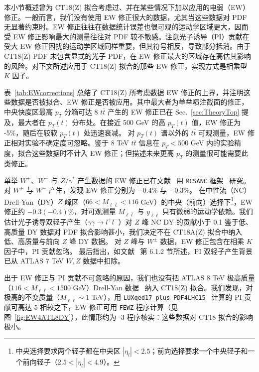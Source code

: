 本小节概述曾为 CT18(Z) 拟合考虑过、并在某些情况下加以应用的电弱（EW）修正。一般而言，我们没有使用 EW 修正很大的数据，尤其当这些数据对 PDF 无显著约束时。EW 修正往往在数据统计误差也很可观的运动学区域更大，因而受 EW 修正影响最大的测量往往对 PDF 较不敏感。注意光子诱导（PI）贡献在受大 EW 修正困扰的运动学区域同样重要，但其符号相反，导致部分抵消。由于 CT18(Z) PDF 未包含显式的光子 PDF，在 EW 修正最大的区域存在高估其影响的风险。对下文所述应用于 CT18(Z) 拟合的那些 EW 修正，实现方式是相乘型 $K$ 因子。

表~\ref{tab:EWcorrections} 总结了 CT18(Z) 所考虑数据 EW 修正的上界，并注明这些数据是否被拟合、EW 修正是否被应用。其中最大者为单举喷注截面的修正，中央快度区最高 $p_{T}$ 分箱可达 8%
$t\bar{t}$ 产生的 EW 修正已在 Sec.~\ref{sec:TheoryTop} 提及，最大者在 $p_{T}(t)$
分布处。在接近 500 GeV 的高 $p_{T}(t)$ 值，EW 修正为
-5\%，随后在较软 $p_{T}(t)$ 处迅速衰减。
对 $p_{T}(t)$ 谱以外的 $t\bar{t}$ 可观测量，EW 修正相对实验不确定度可忽略。鉴于 8 TeV $t\bar{t}$ 信息在 $p_T\! <\! 500$ GeV 内的实验精度，拟合这些数据时不计入 EW 修正；但描述未来更高 $p_T$ 的测量很可能需要此类修正。

单举 $W^+$、$W^-$ 与 $Z/\gamma^*$
产生数据的 EW 修正已在文献~\cite{Aaboud:2016btc} 用 \texttt{MCSANC} 框架~\cite{Arbuzov:2015yja} 研究。
对 $W^{+}$ 与 $W^{-}$ 产生，发现 EW 修正分别为 $-0.4$\% 与 $-0.3$\%。
在中性流（NC）Drell-Yan（DY）$Z$ 峰区（$66\!<\!M_{\ell \bar \ell}\!<\!116$ GeV）的中央（前向）选择下\footnote{中央选择要求两个轻子都在中央区 $|\eta_l|<2.5$；前向选择要求一个中央轻子和一个前向轻子（$2.5<|\eta_l|<4.9$）。}，EW
修正约 $-0.3(-0.4)\%$，对可观测量 $M_{\ell \bar \ell}$ 与 $y_{\ell \bar \ell}$ 只有微弱的运动学依赖。我们估计光子诱导双轻子产生（$\gamma\gamma\to l^{+}l^{-}$）对 $Z$ 峰 NC DY 的贡献小于 0.1%
鉴于低、高质量 DY 数据对 PDF 拟合影响甚小，我们决定不在 CT18A(Z) 拟合中纳入低、高质量与前向 $Z$ 峰 DY 数据。
对 $Z$ 峰与 $W^\pm$ 数据，EW 修正包含在相乘 $K$ 因子中，PI 贡献忽略。
最后指出，如文献~\cite{Aaboud:2016btc} 第 6.1.2 节所述，PI 双轻子产生背景已从 ATLAS 7 TeV $W, Z$ 数据中扣除。

出于 EW 修正与 PI 贡献不可忽略的原因，我们也没有把 ATLAS 8 TeV 极高质量（$116\!<\!M_{\ell \bar \ell}\!<\!1500$ GeV）Drell-Yan 数据~\cite{ATLAS8DY} 纳入 CT18(Z) 拟合。我们发现，对极高的不变质量（$M_{\ell \bar \ell}\!\sim\!1$ TeV），用 \texttt{LUXqed17\_plus\_PDF4LHC15}~\cite{Manohar:2017eqh} 计算的 PI 贡献可高达 5%
相较之下，EW 修正可用 \texttt{FEWZ}
程序计算（见图~\ref{fig:EW4ATL8DY}），此情形约为 -3%
程序核实：这些数据对 CT18 拟合的影响极小。

